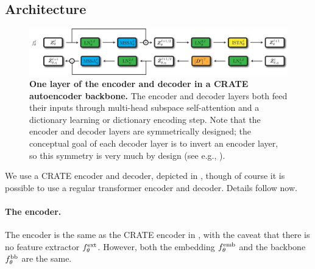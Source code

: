 \documentclass[../../book-main.tex]{subfiles}
\begin{document}
\subsection{Architecture}\label{sub:image_completion_architecture}

\begin{figure}
    \centering 
    \includegraphics[width=\textwidth]{chapters/chapter7/figs/crate_ae_backbone.pdf}
    \caption{\small\textbf{One layer of the encoder and decoder in a CRATE autoencoder backbone.} The encoder and decoder layers both feed their inputs through multi-head subspace self-attention and a dictionary learning or dictionary encoding step. Note that the encoder and decoder layers are symmetrically designed; the conceptual goal of each decoder layer is to invert an encoder layer, so this symmetry is very much by design (see e.g., ).}
\end{figure}

We use a CRATE encoder and decoder, depicted in , though of course it is possible to use a regular transformer encoder and decoder. Details follow now.

\paragraph{The encoder.} The encoder is the same as the CRATE encoder in , with the caveat that there is no feature extractor \(f_{\theta}^{\mathrm{ext}}\). However, both the embedding \(f_{\theta}^{\mathrm{emb}}\) and the backbone \(f_{\theta}^{\mathrm{bb}}\) are the same.
\end{document}
